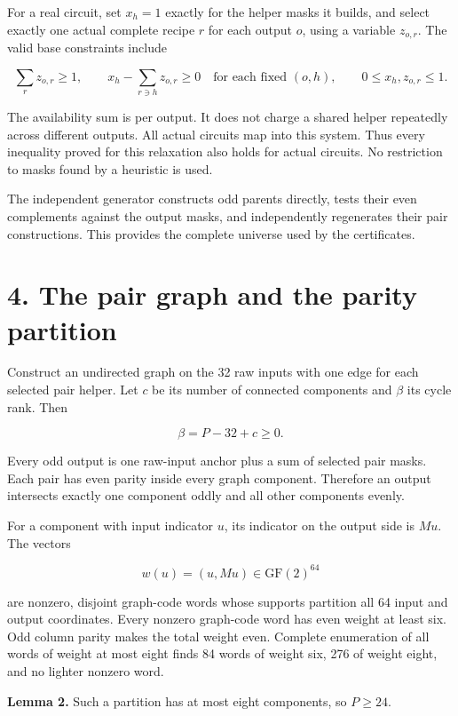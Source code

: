 For a real circuit, set \(x_h=1\) exactly for the helper masks it builds, and select exactly one actual complete recipe \(r\) for each output \(o\), using a variable \(z_{o,r}\). The valid base constraints include

\[
\sum_r z_{o,r}\geq1,\qquad
x_h-\sum_{r\ni h}z_{o,r}\geq0\quad\text{for each fixed }(o,h),
\qquad 0\leq x_h,z_{o,r}\leq1.
\]

The availability sum is per output. It does not charge a shared helper repeatedly across different outputs. All actual circuits map into this system. Thus every inequality proved for this relaxation also holds for actual circuits. No restriction to masks found by a heuristic is used.

The independent generator \texttt{} constructs odd parents directly, tests their even complements against the output masks, and independently regenerates their pair constructions. This provides the complete universe used by the certificates.

\hypertarget{the-pair-graph-and-the-parity-partition}{%
\section{4. The pair graph and the parity partition}\label{the-pair-graph-and-the-parity-partition}}

Construct an undirected graph on the 32 raw inputs with one edge for each selected pair helper. Let \(c\) be its number of connected components and \(\beta\) its cycle rank. Then

\[\beta=P-32+c\geq0.\]

Every odd output is one raw-input anchor plus a sum of selected pair masks. Each pair has even parity inside every graph component. Therefore an output intersects exactly one component oddly and all other components evenly.

For a component with input indicator \(u\), its indicator on the output side is \(Mu\). The vectors

\[w(u)=(u,Mu)\in\mathrm{GF}(2)^{64}\]

are nonzero, disjoint graph-code words whose supports partition all 64 input and output coordinates. Every nonzero graph-code word has even weight at least six. Odd column parity makes the total weight even. Complete enumeration of all words of weight at most eight finds 84 words of weight six, 276 of weight eight, and no lighter nonzero word.

\textbf{Lemma 2.} Such a partition has at most eight components, so \(P\geq24\).

